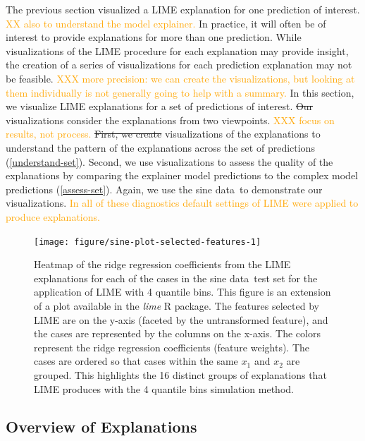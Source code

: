 \documentclass[AMS,STIX2COL]{WileyNJD-v2}\usepackage[]{graphicx}\usepackage[]{color}
\newenvironment{knitrout}{}{} %
\newcommand{\hh}[1]{\textcolor{orange}{#1}}
\newcommand{\data}{sine data}
\begin{document}
{The previous section visualized a LIME explanation for one prediction of interest. \hh{XX also to understand the model explainer.} In practice, it will often be of interest to provide explanations for more than one prediction. While visualizations of the LIME procedure for each explanation may provide insight, the creation of a series of visualizations for each prediction explanation may not be feasible. \hh{XXX more precision: we can create the visualizations, but looking at them individually is not generally going to help with a summary.} In this section, we visualize LIME explanations for a set of predictions of interest.
\sout{Our} visualizations consider the explanations from two viewpoints. \hh{XXX focus on results, not process. } \sout{First, we create} visualizations of the explanations to understand the pattern of the explanations across the set of predictions (\autoref{understand-set}).
Second, we use visualizations to assess the quality of the explanations by comparing the explainer model predictions to the complex model predictions (\autoref{assess-set}). Again, we use the \data \ to demonstrate our visualizations. \hh{In all of these diagnostics default settings of LIME were applied to produce explanations.}

\begin{figure}[!htbp]
\begin{knitrout}
\color{fgcolor}
\texttt{[image: figure/sine-plot-selected-features-1]} 

\end{knitrout}
\caption{Heatmap of the ridge regression coefficients from the LIME explanations for each of the cases in the \data \ test set for the application of LIME with 4 quantile bins. This figure is an extension of a plot available in the \emph{lime} R package. The features selected by LIME are on the y-axis (faceted by the untransformed feature), and the cases are represented by the columns on the x-axis. The colors represent the ridge regression coefficients (feature weights). The cases are ordered so that cases within the same $x_1$ and $x_2$ are grouped. This highlights the 16 distinct groups of explanations that LIME produces with the 4 quantile bins simulation method.}
\label{fig:sine-plot-selected-features}
\end{figure}

\subsection{Overview of Explanations} \label{understand-set}

}
\end{document}
